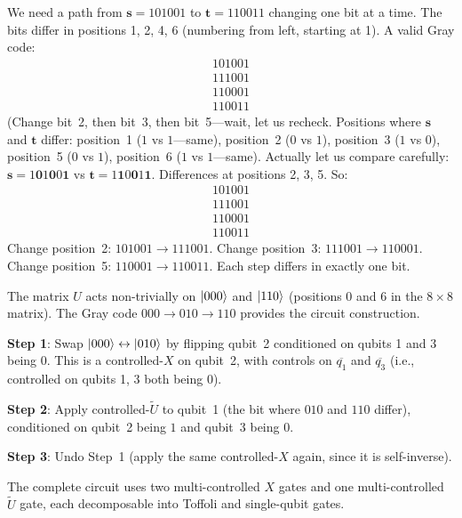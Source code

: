 \documentclass[12pt,oneside]{amsart}
\begin{document}
\begin{exercise}
\end{exercise}
\begin{solution}
  We need a path from $\mathbf{s}=101001$ to $\mathbf{t}=110011$ changing
  one bit at a time.  The bits differ in positions 1, 2, 4, 6
  (numbering from left, starting at 1).  A valid Gray code:
  \[
    \begin{matrix}
      101001 \\
      111001 \\
      110001 \\
      110011
    \end{matrix}
  \]
  (Change bit~2, then bit~3, then bit~5---wait, let us recheck. Positions
  where $\mathbf{s}$ and $\mathbf{t}$ differ: position~1 ($1$ vs $1$---same),
  position~2 ($0$ vs $1$), position~3 ($1$ vs $0$), position~5 ($0$ vs $1$),
  position~6 ($1$ vs $1$---same).  Actually let us compare carefully:
  $\mathbf{s}=1\mathbf{0}1\mathbf{0}0\mathbf{1}$ vs
  $\mathbf{t}=1\mathbf{1}0\mathbf{0}1\mathbf{1}$.
  Differences at positions 2, 3, 5.  So:
  \[
    \begin{matrix}
      101001 \\
      111001 \\
      110001 \\
      110011
    \end{matrix}
  \]
  Change position~2: $101001\to 111001$. Change position~3: $111001\to 110001$.
  Change position~5: $110001\to 110011$.  Each step differs in exactly one
  bit. \qedhere
\end{solution}

\begin{exercise}
\end{exercise}
\begin{solution}
  The matrix $U$ acts non-trivially on $|000\rangle$ and $|110\rangle$
  (positions 0 and 6 in the $8\times 8$ matrix). The Gray code
  $000\to 010\to 110$ provides the circuit construction.

  \textbf{Step 1}: Swap $|000\rangle\leftrightarrow|010\rangle$ by flipping
  qubit~2 conditioned on qubits 1 and 3 being $0$. This is a controlled-$X$
  on qubit~2, with controls on $\overline{q_1}$ and $\overline{q_3}$
  (i.e., controlled on qubits 1, 3 both being 0).

  \textbf{Step 2}: Apply controlled-$\widetilde{U}$ to qubit~1 (the bit
  where $010$ and $110$ differ), conditioned on qubit~2 being $1$ and
  qubit~3 being $0$.

  \textbf{Step 3}: Undo Step~1 (apply the same controlled-$X$ again, since
  it is self-inverse).

  The complete circuit uses two multi-controlled $X$ gates and one
  multi-controlled $\widetilde{U}$ gate, each decomposable into Toffoli and
  single-qubit gates.
\end{solution}
\end{document}
